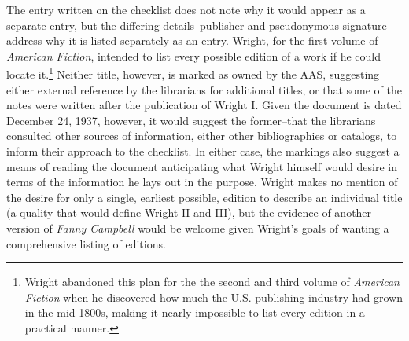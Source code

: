 The entry written on the checklist does not note why it would appear as a separate entry, but the differing details--publisher and pseudonymous signature--address why it is listed separately as an entry. Wright, for the first volume of \textit{American Fiction}, intended to list every possible edition of a work if he could locate it.\footnote{Wright abandoned this plan for the the second and third volume of \textit{American Fiction} when he discovered how much the U.S. publishing industry had grown in the mid-1800s, making it nearly impossible to list every edition in a practical manner.} Neither title, however, is marked as owned by the AAS, suggesting either external reference by the librarians for additional titles, or that some of the notes were written after the publication of Wright I. Given the document is dated December 24, 1937, however, it would suggest the former--that the librarians consulted other sources of information, either other bibliographies or catalogs, to inform their approach to the checklist. In either case, the markings also suggest a means of reading the document anticipating what Wright himself would desire in terms of the information he lays out in the purpose. Wright makes no mention of the desire for only a single, earliest possible, edition to describe an individual title (a quality that would define Wright II and III), but the evidence of another version of \textit{Fanny Campbell} would be welcome given Wright's goals of wanting a comprehensive listing of editions. 

